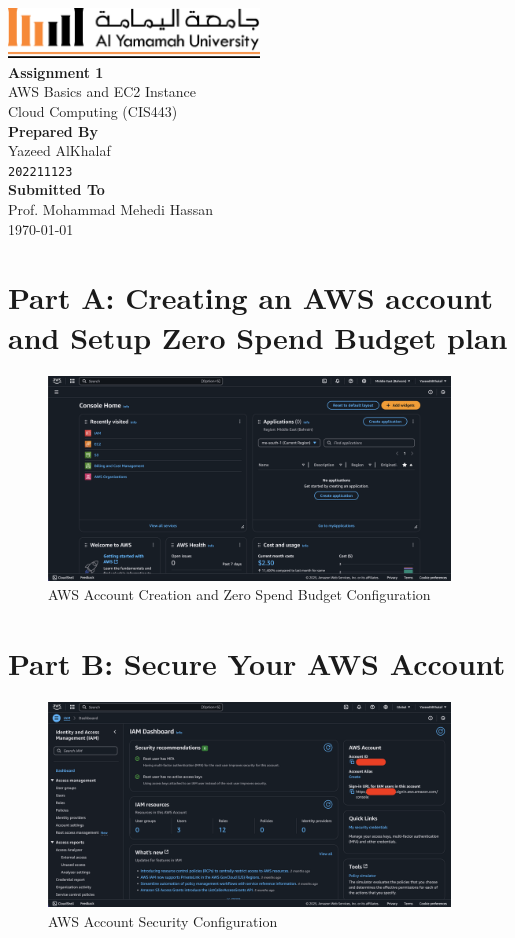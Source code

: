 \documentclass[a4paper,12pt]{article}
\def\maketitle{
  \begin{titlepage}
    \centering
    \vspace*{-1cm}
    \includegraphics[width=0.5\textwidth]{yu-logo.png}\\[2cm]
    
    {\huge\bfseries Assignment 1\\}
    \vspace{0.5cm}
    {\Large AWS Basics and EC2 Instance}\\[1.5cm]
    
    {\large Cloud Computing (CIS443)}\\[3cm]
    
    {\large\bfseries Prepared By}\\[0.3cm]
    {\Large Yazeed AlKhalaf}\\
    {\texttt{202211123}}\\[2cm]
    
    {\large\bfseries Submitted To}\\[0.3cm]
    {\Large Prof. Mohammad Mehedi Hassan}\\[2cm]
    
    {\large \today}
    
    \vfill
  \end{titlepage}
}
\begin{document}
\maketitle

\thispagestyle{fancy}
\tableofcontents
\newpage

\thispagestyle{fancy}
\listoffigures
\newpage

\setcounter{page}{1}

\section{Part A: Creating an AWS account and Setup Zero Spend Budget plan}

\begin{figure}[H]
    \centering
    \includegraphics[width=0.95\textwidth]{aws-account.png}
    \caption{AWS Account Creation and Zero Spend Budget Configuration}
    \label{fig:aws-account}
\end{figure}

\newpage

\section{Part B: Secure Your AWS Account}

\begin{figure}[H]
    \centering
    \includegraphics[width=0.95\textwidth]{secure-your-account.png}
    \caption{AWS Account Security Configuration}
    \label{fig:secure-account}
\end{figure}
\end{document}

